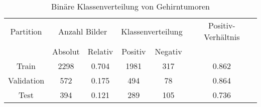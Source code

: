 \begin{table}[h]
\centering
\begin{tabular}{@{}cccccc@{}}
\toprule
Partition & \multicolumn{2}{c}{Anzahl Bilder} & \multicolumn{2}{c}{Klassenverteilung} & Positiv-Verhältnis\\ 
\cmidrule(lr){2-3} \cmidrule(lr){4-5} 
           & Absolut & Relativ & Positiv & Negativ \\ 
\midrule
Train      & 2298 & 0.704 & 1981 & 317 & 0.862 \\
Validation & 572  & 0.175 & 494  & 78  & 0.864 \\
Test       & 394  & 0.121 & 289  & 105 & 0.736 \\ 
\bottomrule
\end{tabular}
\caption{Binäre Klassenverteilung von Gehirntumoren}
\label{tab:mri-binaere-klassenverteilung}
\end{table}